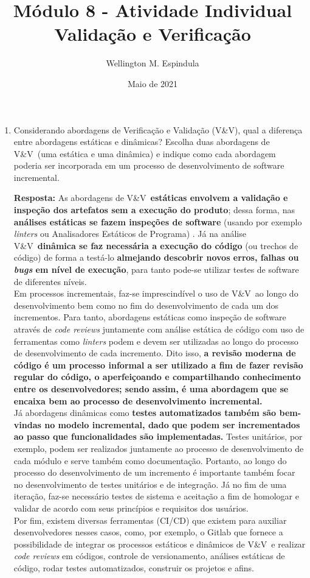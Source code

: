 \documentclass[12pt, a4paper]{article}
\title{Módulo 8 - Atividade Individual \\
  \large Validação e Verificação}
\author{Wellington M. Espindula}
\date{Maio de 2021}
\newcommand{\tit}[1]{\textit{#1}}
\newcommand{\tb}[1]{\textbf{#1}}
\newcommand{\ssw}{software }
\newcommand{\vv}{V\&V}
\newcommand{\question}[1]{\item {#1}}
\newcommand{\answer}[1]{\par \tb{Resposta:} #1}
\begin{document}
    \maketitle
    
    \begin{enumerate}[label=\textbf{\arabic*.}]
        \question{Considerando abordagens de Verificação e Validação (\vv), qual a diferença entre abordagens estáticas e dinâmicas? Escolha duas abordagens de \vv \ (uma estática e uma dinâmica) e indique como cada abordagem poderia ser incorporada em um processo de desenvolvimento de software incremental.}
        \answer{
            As abordagens de \vv \ \tb{estáticas envolvem a validação e inspeção dos artefatos sem a execução do produto}; dessa forma, nas \tb{análises estáticas se fazem inspeções de \ssw} (usando por exemplo \tit{linters} ou Analisadores Estáticos de Programa) . Já na análise \vv \  \tb{dinâmica se faz necessária a execução do código} (ou trechos de código) de forma a testá-lo \tb{almejando descobrir novos erros, falhas ou \tit{bugs} em nível de execução}, para tanto pode-se utilizar testes de \ssw de diferentes níveis. \\
            Em processos incrementais, faz-se imprescindível o uso de \vv \ ao longo do desenvolvimento bem como no fim do desenvolvimento de cada um dos incrementos. Para tanto, abordagens estáticas como inspeção de \ssw através de \tit{code reviews} juntamente com análise estática de código com uso de ferramentas como \tit{linters} podem e devem ser utilizadas ao longo do processo de desenvolvimento de cada incremento. Dito isso, \tb{a revisão moderna de código é um processo informal a ser utilizado a fim de fazer revisão regular do código, o aperfeiçoando e compartilhando conhecimento entre os desenvolvedores; sendo assim, é uma abordagem que se encaixa bem ao processo de desenvolvimento incremental.} \\
            Já abordagens dinâmicas como \tb{testes automatizados também são bem-vindas no modelo incremental, dado que podem ser incrementados ao passo que funcionalidades são implementadas.} Testes unitários, por exemplo, podem ser realizados juntamente ao processo de desenvolvimento de cada módulo e serve também como documentação. Portanto, ao longo do processo do desenvolvimento de um incremento é importante também focar no desenvolvimento de testes unitários e de integração. Já no fim de uma iteração, faz-se necessário testes de sistema e aceitação a fim de homologar e validar de acordo com seus princípios e requisitos dos usuários. \\
            Por fim, existem diversas ferramentas (CI/CD) que existem para auxiliar desenvolvedores nesses casos, como, por exemplo, o Gitlab que fornece a possibilidade de integrar os processos estáticos e dinâmicos de \vv \ e realizar \tit{code reviews} em códigos, controle de versionamento, análises estáticas de código, rodar testes automatizados, construir os projetos e afins.
        } \newpage
        

\end{enumerate}
\end{document}
